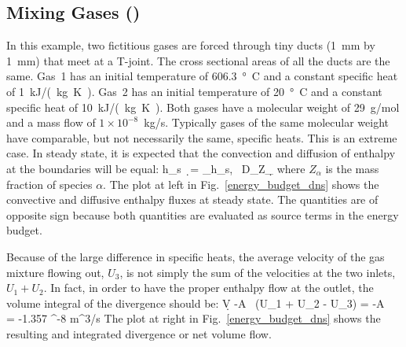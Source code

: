 \documentclass[11pt]{book}
\begin{document}
\subsection{Mixing Gases (\texorpdfstring{}{energy\_budget\_dns})}
\label{energy_budget_dns_100}

In this example, two fictitious gases are forced through tiny ducts (1~mm by 1~mm) that meet at a T-joint. The cross sectional areas of all the ducts are the same. Gas~1 has an initial temperature of 606.3~\si{\degree C} and a constant specific heat of 1~\si{kJ/(kg.K)}. Gas~2 has an initial temperature of 20~\si{\degree C} and a constant specific heat of 10~\si{kJ/(kg.K)}. Both gases have a molecular weight of 29~g/mol and a mass flow of $1 \times 10^{-8}$~kg/s. Typically gases of the same molecular weight have comparable, but not necessarily the same, specific heats. This is an extreme case. In steady state, it is expected that the convection and diffusion of enthalpy at the boundaries will be equal:
\be \int h_{\rm s} \, \rho \bu \cdot \d\bS = \sum_\alpha \int h_{s,\alpha} \, \rho D_\alpha \nabla Z_\alpha \cdot \d\bS \ee
where $Z_\alpha$ is the mass fraction of species $\alpha$.  The plot at left in Fig.~\ref{energy_budget_dns} shows the convective and diffusive enthalpy fluxes at steady state. The quantities are of opposite sign because both quantities are evaluated as source terms in the energy budget.

Because of the large difference in specific heats, the average velocity of the gas mixture flowing out, $U_3$, is not simply the sum of the velocities at the two inlets, $U_1+U_2$. In fact, in order to have the proper enthalpy flow at the outlet, the volume integral of the divergence should be:
\be \int \nabla \cdot \bu \; \d V \equiv -A \, (U_1 + U_2 - U_3) = -A \,  = -1.357 ^{-8} \; \hbox{m}^3/\hbox{s} \label{div2} \ee
The plot at right in Fig.~\ref{energy_budget_dns} shows the resulting and integrated divergence or net volume flow.
\end{document}
